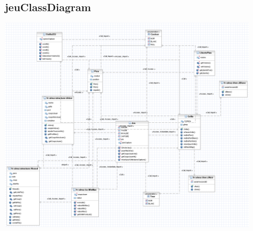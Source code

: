 \documentclass{report}
\begin{document}
\subsection{jeuClassDiagram}
\begin{center}
\includegraphics[scale=0.50]{images/fralmajeuClassDiagram}
\end{center}
\end{document}
